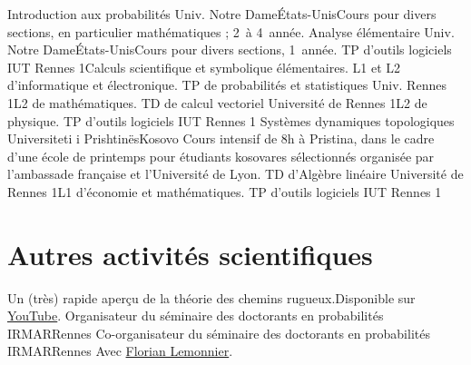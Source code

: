\documentclass[11pt]{moderncv}
\newcommand\Colorhref[2]{\href{#1}{\color{magenta}#2}}
\begin{document}
   {Introduction aux probabilités}
   {Univ. Notre Dame}{États-Unis}{}{Cours pour divers sections, en particulier mathématiques ; 2\ieme\ à 4\ieme\ année.}
   {Analyse élémentaire}
   {Univ. Notre Dame}{États-Unis}{}{Cours pour divers sections, 1\iere\ année.}
   {TP d'outils logiciels}
   {IUT Rennes 1}{}{}{Calculs scientifique et symbolique élémentaires. L1 et L2 d'informatique et électronique.}
\cventry{             }
   {TP de probabilités et statistiques}
   {Univ. Rennes 1}{}{}{L2 de mathématiques.}
   {TD de calcul vectoriel}
   {Université de Rennes 1}{}{}{L2 de physique.}
\cventry{         }
   {TP d'outils logiciels}
   {IUT Rennes 1}{}{}{}
   {Systèmes dynamiques topologiques}
   {Universiteti i Prishtinës}{Kosovo}{}
   {Cours intensif de 8h à Pristina, dans le cadre d'une école de printemps pour étudiants kosovares sélectionnés organisée par l'ambassade française et l'Université de Lyon.}
   {TD d'Algèbre linéaire}
   {Université de Rennes 1}{}{}{L1 d'économie et mathématiques.}
   {TP d'outils logiciels}
   {IUT Rennes 1}{}{}{}

\section{Autres activités scientifiques}

   {Un (très) rapide aperçu de la théorie des chemins rugueux.\newline Disponible sur \Colorhref{https://youtu.be/r31qisjgbK8}{YouTube}.}
   {Organisateur du séminaire des doctorants en probabilités}
   {IRMAR}{Rennes}{}
   {}
   {Co-organisateur du séminaire des doctorants en probabilités}
   {IRMAR}{Rennes}{}
   {Avec \href{http://perso.eleves.ens-rennes.fr/people/florian.lemonnier/}{Florian Lemonnier}.}
\end{document}
